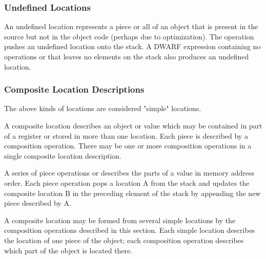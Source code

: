 \begin{enumerate}[1. ]
\subsubsection{Undefined Locations}
\label{chap:undefinedlocations}
An undefined location represents a piece or all of an object that is
present in the source but not in the object code (perhaps due to
optimization). The \DWOPundefinedNAME{} operation pushes an undefined
location onto the stack. A DWARF expression containing no operations
or that leaves no elements on the stack also produces an undefined
location.

\end{enumerate}

\subsubsection{Composite Location Descriptions}
\label{chap:compositelocationdescriptions}
The above kinds of locations are considered "simple" locations.

A composite location describes an object or value which may be
contained in part of a register or stored in more than one
location. Each piece is described by a composition operation. There
may be one or more composition operations in a single composite
location description.

A series of piece operations \DWOPpieceNAME{} or \DWOPbitpieceNAME{}
describes the parts of a value in memory address order. Each piece
operation pops a location A from the stack and updates the composite
location B in the preceding element of the stack by appending the new
piece described by A.

A composite location may be formed from several simple locations by
the composition operations described in this section. Each simple
location describes the location of one piece of the object; each
composition operation describes which part of the object is located
there.

